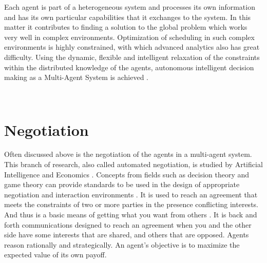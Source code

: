 Each agent is part of a heterogeneous system and processes its own information and has its own particular capabilities that it exchanges to the system. In this matter it contributes to finding a solution to the global problem which works very well in complex environments. Optimization of scheduling in such complex environments is highly constrained, with which advanced analytics also has great difficulty. Using the dynamic, flexible and intelligent relaxation of the constraints within the distributed knowledge of the agents, autonomous intelligent decision making as a Multi-Agent System is achieved \citep{rabelo1999multi}. 


\
\section{Negotiation}
\label{sec:negotiation}
Often discussed above is the negotiation of the agents in a multi-agent system. This branch of research, also called automated negotiation, is studied by Artificial Intelligence and Economics \citep{jennings2001automated}. Concepts from fields such as decision theory and game theory can provide standards to be used in the design of appropriate negotiation and interaction environments \citep{jennings2001automated}. It is used to reach an agreement that meets the constraints of two or more parties in the presence conflicting interests. And thus is a basic means of getting what you want from others \citep{fisher1987getting}. It is back and forth communications designed to reach an agreement when you and the other side have some interests that are shared, and others that are opposed. Agents reason rationally and strategically. An agent's objective is to maximize the expected value of its own payoff. 

